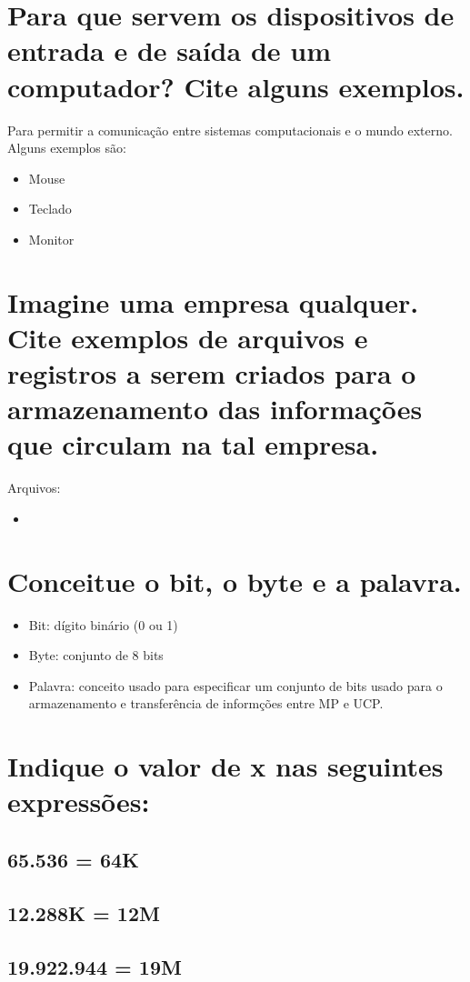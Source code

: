 \documentclass[
	12pt,				%
	openright,			%
	twoside,			%
	a4paper,			%
	english,			%
	french,				%
	spanish,			%
	brazil,				%
	]{abntex2}
\begin{document}
\section{Para que servem os dispositivos de entrada e de saída de um computador? Cite alguns exemplos.}
\label{sec:orga2f354a}
Para permitir a comunicação entre sistemas computacionais e o mundo externo.
Alguns exemplos são:
\begin{itemize}
\item Mouse
\item Teclado
\item Monitor
\end{itemize}
\section{Imagine uma empresa qualquer. Cite exemplos de arquivos e registros a serem criados para o armazenamento das informações que circulam na tal empresa.}
\label{sec:org2eb6e37}
Arquivos:
\begin{itemize}
\item 
\end{itemize}
\section{Conceitue o bit, o byte e a palavra.}
\label{sec:org118ecd2}
\begin{itemize}
\item Bit: dígito binário (0 ou 1)
\item Byte: conjunto de 8 bits
\item Palavra: conceito usado para especificar um conjunto de bits usado para o
armazenamento e transferência de informções entre MP e UCP.
\end{itemize}
\section{Indique o valor de x nas seguintes expressões:}
\label{sec:orgbc10c82}
\subsection{65.536 = 64K}
\label{sec:org96425d2}
\subsection{12.288K = 12M}
\label{sec:org3b6bbb2}
\subsection{19.922.944 = 19M}
\label{sec:orgea4eb01}
\end{document}
